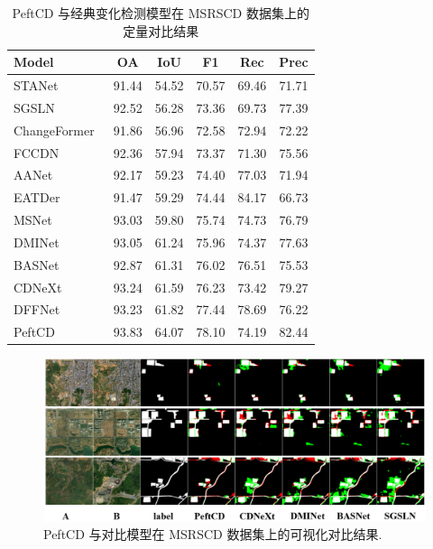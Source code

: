 \begin{table}[!htbp]
\centering
\caption{PeftCD 与经典变化检测模型在 MSRSCD 数据集上的定量对比结果}
\label{tab:peftcd_msrscd}
\begin{tabular}{l c c c c c}
\toprule
\textbf{Model} & \textbf{OA} & \textbf{IoU} & \textbf{F1} & \textbf{Rec} & \textbf{Prec} \\
\midrule
STANet~\cite{chen_spatial-temporal_2020} & 91.44 & 54.52 & 70.57 & 69.46 & 71.71 \\
SGSLN~\cite{zhao_exchanging_2023} & 92.52 & 56.28 & 73.36 & 69.73 & 77.39 \\
ChangeFormer~\cite{bandara2022transformer} & 91.86 & 56.96 & 72.58 & 72.94 & 72.22 \\
FCCDN~\cite{Chen2021FCCDNFC} & 92.36 & 57.94 & 73.37 & 71.30 & 75.56 \\
AANet~\cite{Hang2024AANetAA} & 92.17 & 59.23 & 74.40 & 77.03 & 71.94 \\
EATDer~\cite{Ma2024EATDerEA} & 91.47 & 59.29 & 74.44 & 84.17 & 66.73 \\
MSNet~\cite{Liu2025NetworkAD} & 93.03 & 59.80 & 75.74 & 74.73 & 76.79 \\
DMINet~\cite{feng_change_2023} & 93.05 & 61.24 & 75.96 & 74.37 & 77.63 \\
BASNet~\cite{z_wang_bitemporal_2024} & 92.87 & 61.31 & 76.02 & 76.51 & 75.53 \\
CDNeXt~\cite{wei_robust_2024} & 93.24 & 61.59 & 76.23 & 73.42 & 79.27 \\
DFFNet~\cite{Liu2025FullScaleCD} & 93.23 & 61.82 & 77.44 & 78.69 & 76.22 \\
\midrule
PeftCD & 93.83 & 64.07 & 78.10 & 74.19 & 82.44 \\
\bottomrule
\end{tabular}
\end{table}


\begin{figure}[!htb]
  \centering
  \includegraphics[width=\textwidth]{paper_figures/基于AI基础模型微调的变化检测模型研究/PeftCD/peftcd_msrscd.png}
  \caption{PeftCD 与对比模型在 MSRSCD 数据集上的可视化对比结果.}
  \label{fig:peftcd_msrscd}
\end{figure}


